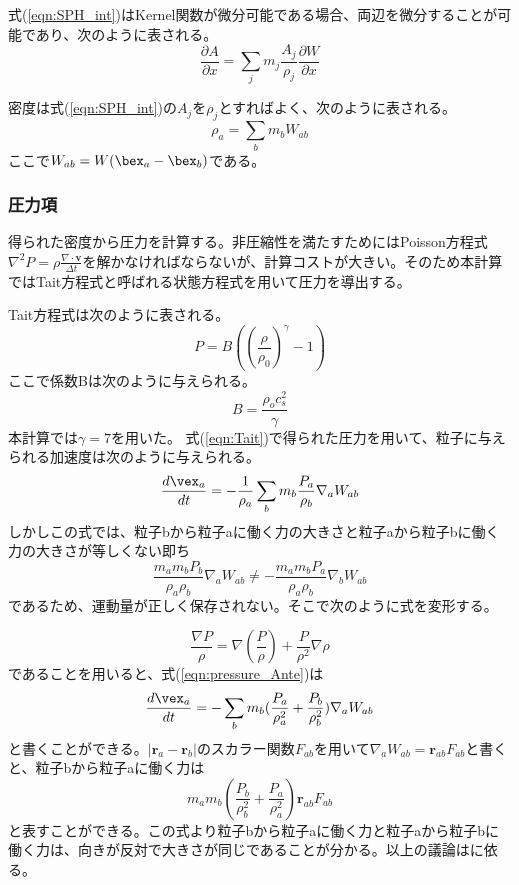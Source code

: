 \documentclass[]{jsarticle}
\begin{document}
式(\ref{eqn:SPH_int})はKernel関数が微分可能である場合、両辺を微分することが可能であり、次のように表される。
\begin{equation}
\frac{\partial A}{\partial x}=\sum_jm_j\frac{A_j}{\rho_j}\frac{\partial W}{\partial x}
\end{equation}

密度は式(\ref{eqn:SPH_int})の$A_j$を$\rho_j$とすればよく、次のように表される。
\begin{equation}
\rho_{a}=\sum_bm_bW_{ab}
\end{equation}
ここで$W_{ab}=W(\bex_a-\bex_b)$である。

\subsubsection{圧力項}
得られた密度から圧力を計算する。非圧縮性を満たすためにはPoisson方程式$\nabla^2P=\rho\frac{\nabla\cdot\bm{v}}{\Delta t}$を解かなければならないが、計算コストが大きい。そのため本計算ではTait方程式と呼ばれる状態方程式を用いて圧力を導出する。

Tait方程式は次のように表される。
\begin{equation}
  \label{eqn:Tait}
P=B((\frac{\rho}{\rho_0})^\gamma-1)
\end{equation}
ここで係数Bは次のように与えられる。
\begin{equation}
B=\frac{\rho_oc_s^2}{\gamma}
\end{equation}
本計算では$\gamma=7$を用いた。
式(\ref{eqn:Tait})で得られた圧力を用いて、粒子に与えられる加速度は次のように与えられる。
\begin{equation}
  \label{eqn:pressure_Ante}
\frac{d\vex_a}{dt}=-\frac{1}{\rho_a}\sum_bm_b\frac{P_a}{\rho_b}\nabla_aW_{ab}
\end{equation}
しかしこの式では、粒子bから粒子aに働く力の大きさと粒子aから粒子bに働く力の大きさが等しくない即ち
\begin{equation}
\frac{m_am_bP_b}{\rho_a\rho_b}\nabla_aW_{ab} \neq -\frac{m_am_bP_a}{\rho_a\rho_b}\nabla_bW_{ab}
\end{equation}
であるため、運動量が正しく保存されない。そこで次のように式を変形する。

\begin{equation}
\frac{\nabla P}{\rho}=\nabla(\frac{P}{\rho})+\frac{P}{\rho^2}\nabla \rho
\end{equation}
であることを用いると、式(\ref{eqn:pressure_Ante})は
\begin{equation}
\frac{d\vex_a}{dt}=-\sum_bm_b(\frac{P_a}{\rho_a^2}+\frac{P_b}{\rho_b^2})\nabla_aW_{ab}
\end{equation}
と書くことができる。$|\bm{r}_a-\bm{r}_b|$のスカラー関数$F_{ab}$を用いて$\nabla_aW_{ab}=\bm{r}_{ab}F_{ab}$と書くと、粒子bから粒子aに働く力は
\begin{equation}
m_am_b(\frac{P_b}{\rho_b^2}+\frac{P_a}{\rho_a^2})\bm{r}_{ab}F_{ab}
\end{equation}
と表すことができる。この式より粒子bから粒子aに働く力と粒子aから粒子bに働く力は、向きが反対で大きさが同じであることが分かる。以上の議論は\cite{Monaghan2005}に依る。
\end{document}
